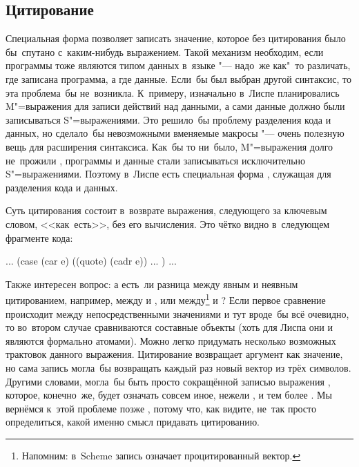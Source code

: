 \subsection{Цитирование}\label{basics/evaluating-forms/ssect:quoting}

Специальная форма  позволяет записать значение, которое без
цитирования было бы~спутано с~каким-нибудь выражением. Такой механизм необходим,
если программы тоже являются типом данных в~языке "--- надо~же как"~то
различать, где записана программа, а где данные. Если~бы был выбран другой
синтаксис, то эта проблема~бы не~возникла. К~примеру, изначально в~Лиспе
планировались M"=выражения \cite{mcc60} для записи действий над данными, а сами
данные должно были записываться S"=выражениями. Это решило~бы проблему
разделения кода и данных, но сделало~бы невозможными вменяемые макросы "---
очень полезную вещь для расширения синтаксиса. Как~бы то ни~было, M"=выражения
долго не~прожили \cite{mcc78a}, программы и данные стали записываться
исключительно S"=выражениями. Поэтому в~Лиспе есть специальная форма ,
служащая для разделения кода и данных.

Суть цитирования состоит в~возврате выражения, следующего за ключевым словом,
<<как~есть>>, без его вычисления. Это чётко видно в~следующем фрагменте кода:

\begin{code:lisp}
... (case (car e)
      ((quote) (cadr e)) ... ) ...
\end{code:lisp}

Также интересен вопрос: а есть~ли разница между явным и неявным цитированием,
например, между  и , или между\footnote{Напомним: в~Scheme
запись  означает процитированный вектор.}  и
? Если первое сравнение происходит между непосредственными
значениями и тут вроде~бы всё очевидно, то во~втором случае сравниваются
составные объекты (хоть для Лиспа они и являются формально атомами). Можно легко
придумать несколько возможных трактовок данного выражения. Цитирование
возвращает аргумент как значение, но сама запись  могла~бы
возвращать каждый раз новый вектор из трёх символов. Другими словами,  могла~бы быть просто сокращённой записью выражения , которое, конечно~же, будет означать совсем иное, нежели , и тем более . Мы вернёмся к~этой проблеме позже
, потому что, как видите, не~так просто
определиться, какой именно смысл придавать цитированию.


